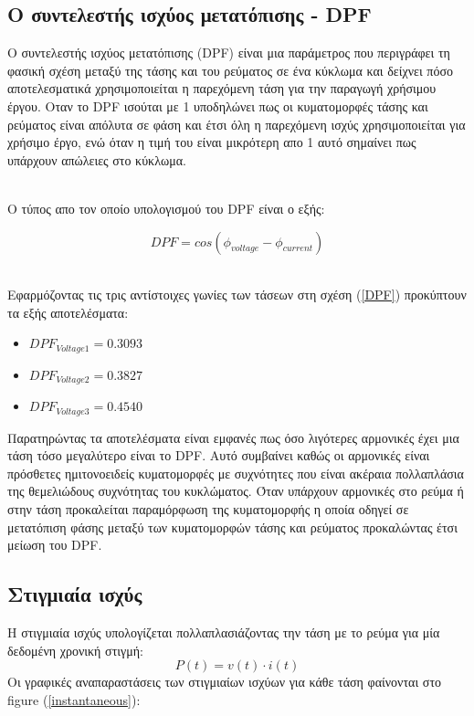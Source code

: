 \subsection*{Ο συντελεστής ισχύος μετατόπισης - DPF}
\label{ex4q2}

 Ο συντελεστής ισχύος μετατόπισης (DPF) είναι μια παράμετρος που περιγράφει τη φασική σχέση μεταξύ της τάσης και του ρεύματος σε ένα κύκλωμα και δείχνει πόσο αποτελεσματικά χρησιμοποιείται η παρεχόμενη τάση για την παραγωγή χρήσιμου έργου. Οταν το DPF ισούται με 1 υποδηλώνει πως οι κυματομορφές τάσης και ρεύματος είναι απόλυτα σε φάση και έτσι όλη η παρεχόμενη ισχύς χρησιμοποιείται για χρήσιμο έργο, ενώ όταν η τιμή του είναι μικρότερη απο 1 αυτό σημαίνει πως υπάρχουν απώλειες στο κύκλωμα. 
 
\noindent\\
Ο τύπος απο τον οποίο υπολογισμού του DPF είναι ο εξής:

\begin{equation}
    DPF = cos(\phi_{voltage}-\phi_{current}) \label{DPF}
\end{equation}

\noindent \\
Εφαρμόζοντας τις τρις αντίστοιχες γωνίες των τάσεων στη σχέση (\ref{DPF}) προκύπτουν τα εξής αποτελέσματα:
	 
\begin{itemize}
    \item $DPF_{Voltage1} = 0.3093$
    \item $DPF_{Voltage2} = 0.3827$
    \item $DPF_{Voltage3} = 0.4540$
\end{itemize}
\noindent
Παρατηρώντας τα αποτελέσματα είναι εμφανές πως όσο λιγότερες αρμονικές έχει μια τάση τόσο μεγαλύτερο είναι το DPF. Αυτό συμβαίνει καθώς οι αρμονικές είναι πρόσθετες ημιτονοειδείς κυματομορφές με συχνότητες που είναι ακέραια πολλαπλάσια της θεμελιώδους συχνότητας του κυκλώματος. Όταν υπάρχουν αρμονικές στο ρεύμα ή στην τάση προκαλείται  παραμόρφωση της κυματομορφής η οποία οδηγεί σε μετατόπιση φάσης μεταξύ των κυματομορφών τάσης και ρεύματος προκαλώντας έτσι μείωση του DPF.
	
\subsection*{Στιγμιαία ισχύς}
\label{ex4q3}
Η στιγμιαία ισχύς υπολογίζεται πολλαπλασιάζοντας την τάση με το ρεύμα για μία δεδομένη χρονική στιγμή:
\begin{equation}
    P(t)=v(t) \cdot i(t)
\end{equation}
Οι γραφικές αναπαραστάσεις των στιγμιαίων ισχύων για κάθε τάση φαίνονται στο figure (\ref{instantaneous}):

